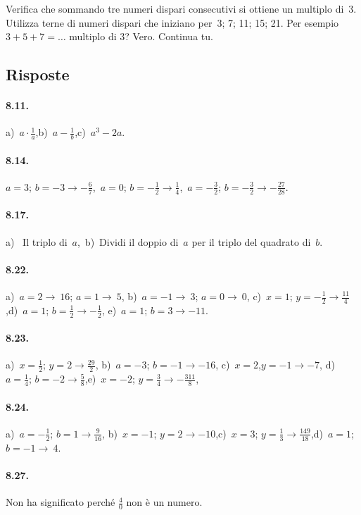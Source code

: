 \begin{esercizio}
 \label{ese:8.32}
 Verifica che sommando tre numeri dispari consecutivi si ottiene un
multiplo di~3. Utilizza terne di numeri dispari che iniziano per~3;
7; 11; 15; 21. Per esempio~$3+5+7= \ldots$ multiplo di 3? Vero. Continua tu.
\end{esercizio}

\subsection{Risposte}
\begin{multicols}{2}
\paragraph{8.11.}
a)~$a \cdot\frac{1}{a}$,\quad b)~$a-\frac{1}{b}$,\quad c)~$a^3-2a$.
\paragraph{8.14.} $a=3$; $b=-3\rightarrow -\frac{6}{7}$,\quad~$a=0$; $b=-\frac{1}{2}\rightarrow \frac{1}{4}$,\quad~$a=-\frac{3}{2}$; $b=-\frac{3}{2}\rightarrow -\frac{27}{28}$.
\paragraph{8.17.}
a)~ Il triplo di~$a$,\quad ~b)~Dividi il doppio di~$a$ per il triplo del quadrato di~$b$.
\paragraph{8.22.}
a)~$a=2 \rightarrow~16$; $a=1 \rightarrow~5$, \quad b)~$a=-1 \rightarrow~3$; $a=0 \rightarrow~0$,
c)~$x=1$; $y=-\frac{1}{2} \rightarrow \frac{11}{4}$,\quad d)~$a=1$; $b=\frac{1}{2}\rightarrow -\frac{1}{2}$, \quad e)~$a=1$; $b=3 \rightarrow -11$.
\paragraph{8.23.}
a)~$x=\frac{1}{2}$; $y=2 \rightarrow \frac{29}{2}$, \quad b)~$a=-3$; $b=-1 \rightarrow -16$, \quad c)~$x=2$,$y=-1 \rightarrow -7$,
d)~$a=\frac{1}{4}$; $b=-2 \rightarrow \frac{5}{8}$,\quad e)~$x=-2$; $y=\frac{3}{4} \rightarrow -\frac{311}8{}$,\quad
\paragraph{8.24.}
a)~$a=-\frac{1}{2}$; $b=1 \rightarrow \frac{9}{16}$,
b)~$x=-1$; $y=2 \rightarrow -10$,\quad c)~$x=3$; $y=\frac{1}{3} \rightarrow \frac{149}{18}$,\quad d)~$a=1$; $b=-1 \rightarrow~4$.
\paragraph{8.27.} Non ha significato perché $\frac{4}{0}$ non è un numero.
\end{multicols}
